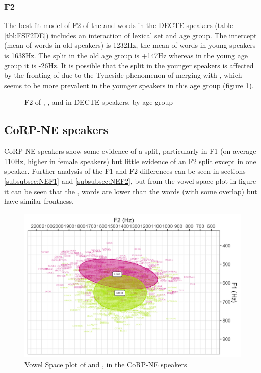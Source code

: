 \documentclass[../../../00.FullDoc/tex/ThesisSkeleton-draft2]{subfiles}
\begin{document}
\subsubsection{F2}
The best fit model of F2 of the \foot{} and \strutt{} words in the DECTE speakers (table \ref{tbl:FSF2DE}) includes an interaction of lexical set and age group. The intercept (mean of \foot{} words in old speakers) is 1232Hz, the mean of \foot{} words in young speakers is 1638Hz. The split in the old age group is +147Hz whereas in the young age group it is -26Hz. It is possible that the split in the younger speakers is affected by the  fronting of \foot{} due to the Tyneside phenomenon of \foot{} merging with \goose{}, which seems to be more prevalent in the younger speakers in this age group (figure \ref{fig:FSGF2DE-age}).




\begin{figure}
	\centering
	
	\caption{F2 of \foot{}, \strutt{}, and \goose{} in DECTE speakers, by age group} \label{fig:FSGF2DE-age}
\end{figure}


\subsection{CoRP-NE speakers}
CoRP-NE speakers show some evidence of a \FS{} split, particularly in F1 (on average 110Hz, higher in female speakers) but little evidence of an F2 split except in one speaker. Further analysis of the F1 and F2 differences can be seen in sections \ref{subsubsec:NEF1} and \ref{subsubsec:NEF2}, but from the vowel space plot in figure it can be seen that the \strutt{}, words are lower than the \foot{} words (with some overlap) but have similar frontness.

\begin{figure}[h]
	\includegraphics[width=\textwidth]{../figures/FS-NE-vplot.png}
	\caption{Vowel Space plot of \foot{} and \strutt{}, in the CoRP-NE speakers} \label{fig:FSvplotNE}
\end{figure}
\end{document}

